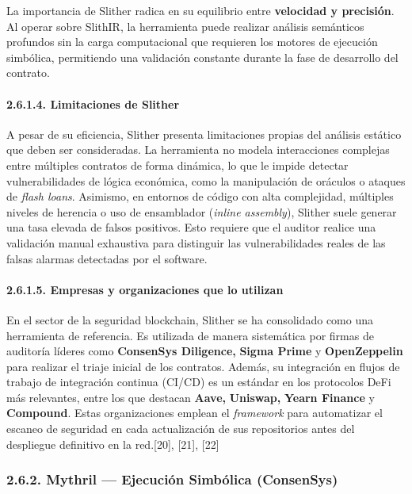 La importancia de Slither radica en su equilibrio entre
\textbf{velocidad y precisión}. Al operar sobre SlithIR, la herramienta
puede realizar análisis semánticos profundos sin la carga computacional
que requieren los motores de ejecución simbólica, permitiendo una
validación constante durante la fase de desarrollo del contrato.

\paragraph{2.6.1.4. Limitaciones de
Slither}\label{limitaciones-de-slither}

A pesar de su eficiencia, Slither presenta limitaciones propias del
análisis estático que deben ser consideradas. La herramienta no modela
interacciones complejas entre múltiples contratos de forma dinámica, lo
que le impide detectar vulnerabilidades de lógica económica, como la
manipulación de oráculos o ataques de \emph{flash loans}. Asimismo, en
entornos de código con alta complejidad, múltiples niveles de herencia o
uso de ensamblador (\emph{inline assembly}), Slither suele generar una
tasa elevada de falsos positivos. Esto requiere que el auditor realice
una validación manual exhaustiva para distinguir las vulnerabilidades
reales de las falsas alarmas detectadas por el software.

\paragraph{2.6.1.5. Empresas y organizaciones que lo
utilizan}\label{empresas-y-organizaciones-que-lo-utilizan}

En el sector de la seguridad blockchain, Slither se ha consolidado como
una herramienta de referencia. Es utilizada de manera sistemática por
firmas de auditoría líderes como \textbf{ConsenSys Diligence,}
\textbf{Sigma Prime} y \textbf{OpenZeppelin} para realizar el triaje
inicial de los contratos. Además, su integración en flujos de trabajo de
integración continua (CI/CD) es un estándar en los protocolos DeFi más
relevantes, entre los que destacan \textbf{Aave,} \textbf{Uniswap,}
\textbf{Yearn Finance} y \textbf{Compound}. Estas organizaciones emplean
el \emph{framework} para automatizar el escaneo de seguridad en cada
actualización de sus repositorios antes del despliegue definitivo en la
red.{[}20{]}, {[}21{]}, {[}22{]}

\subsubsection{2.6.2. Mythril --- Ejecución Simbólica
(ConsenSys)}\label{mythril-ejecuciuxf3n-simbuxf3lica-consensys}

